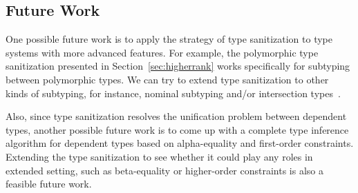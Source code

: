 \subsection{Future Work}

One possible future work is to apply the strategy of type sanitization to type
systems with more advanced features. For example, the polymorphic type
sanitization presented in Section~\ref{sec:higherrank} works specifically for
subtyping between polymorphic types. We can try to extend type sanitization to
other kinds of subtyping, for instance, nominal subtyping and/or intersection
types~\citep{pottinger1980type, coppo1981functional}.

Also, since type sanitization resolves the unification problem between dependent
types, another possible future work is to come up with a complete type inference
algorithm for dependent types based on alpha-equality and first-order
constraints. Extending the type sanitization to see whether it could play
any roles in extended setting, such as beta-equality or higher-order constraints
is also a feasible future work.
